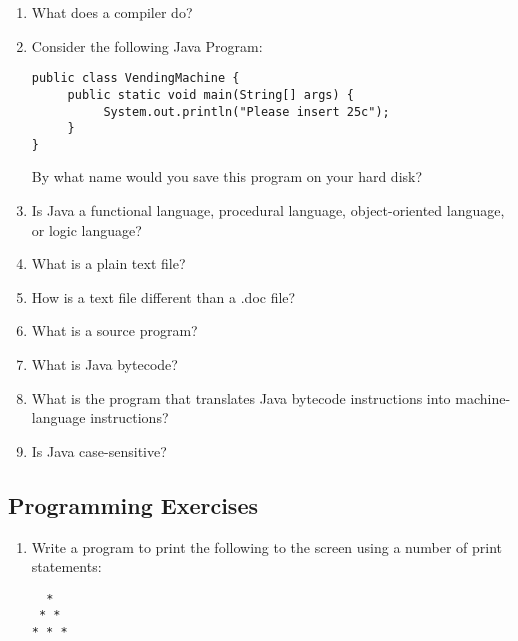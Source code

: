 \setcounter{counter}{1}
\begin{enumerate}[label={\arabic{counter}\addtocounter{counter}{1}}.]

\item What does a compiler do?

\item Consider the following Java Program:
\begin{lstlisting}
public class VendingMachine {
     public static void main(String[] args) {
          System.out.println("Please insert 25c");
     }
}
\end{lstlisting}
By what name would you save this program on your hard disk?

\item Is Java a functional language, procedural language, object-oriented language, or logic language?

\item What is a plain text file?

\item How is a text file different than a .doc file?

\item What is a source program?

\item What is Java bytecode?

\item What is the program that translates Java bytecode instructions into machine-language instructions?

\item Is Java case-sensitive?

\end{enumerate}

\subsection{Programming Exercises}

\setcounter{counter}{1}
\begin{enumerate}[label={\arabic{counter}\addtocounter{counter}{1}}.]
\item Write a program to print the following to the screen using a number of print statements:
\begin{verbatim}
  *
 * *
* * *
\end{verbatim}
\end{enumerate}